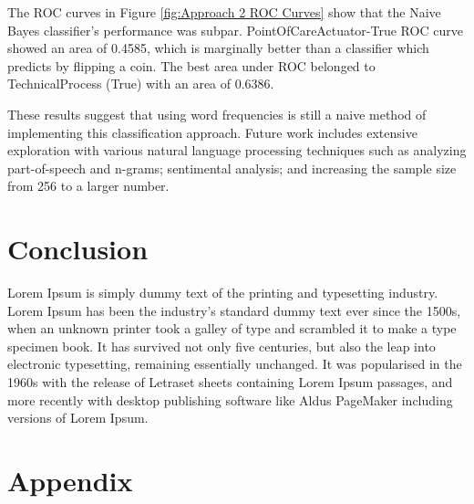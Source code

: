 \documentclass[11pt, notitlepage,abstracton,oneside]{article}   	%
\begin{document}
The ROC curves in Figure \ref{fig:Approach 2 ROC Curves} show that the Naive Bayes classifier's performance was subpar. PointOfCareActuator-True ROC curve showed an area of 0.4585, which is marginally better than a classifier which predicts by flipping a coin. The best area under ROC belonged to TechnicalProcess (True) with an area of 0.6386.

These results suggest that using word frequencies is still a naive method of implementing this classification approach. Future work includes extensive exploration with various natural language processing techniques such as analyzing part-of-speech and n-grams; sentimental analysis; and increasing the sample size from 256 to a larger number.

\section{Conclusion}
Lorem Ipsum is simply dummy text of the printing and typesetting industry. Lorem Ipsum has been the industry's standard dummy text ever since the 1500s, when an unknown printer took a galley of type and scrambled it to make a type specimen book. It has survived not only five centuries, but also the leap into electronic typesetting, remaining essentially unchanged. It was popularised in the 1960s with the release of Letraset sheets containing Lorem Ipsum passages, and more recently with desktop publishing software like Aldus PageMaker including versions of Lorem Ipsum.

\section{Appendix}
\end{document}
